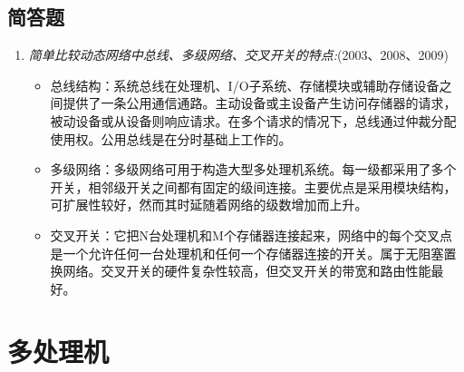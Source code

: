 \documentclass[a4paper]{ctexart}
\begin{document}
\subsection{简答题}
\begin{enumerate}
  \item \emph{简单比较动态网络中总线、多级网络、交叉开关的特点:}(2003、2008、2009)
  \begin{itemize}
    \item 总线结构：系统总线在处理机、I/O子系统、存储模块或辅助存储设备之间提供了一条公用通信通路。主动设备或主设备产生访问存储器的请求，被动设备或从设备则响应请求。在多个请求的情况下，总线通过仲裁分配使用权。公用总线是在分时基础上工作的。
    \item 多级网络：多级网络可用于构造大型多处理机系统。每一级都采用了多个开关，相邻级开关之间都有固定的级间连接。主要优点是采用模块结构，可扩展性较好，然而其时延随着网络的级数增加而上升。
    \item 交叉开关：它把N台处理机和M个存储器连接起来，网络中的每个交叉点是一个允许任何一台处理机和任何一个存储器连接的开关。属于无阻塞置换网络。交叉开关的硬件复杂性较高，但交叉开关的带宽和路由性能最好。
  \end{itemize}
  
\end{enumerate}

\newpage
\section{多处理机}
\end{document}
